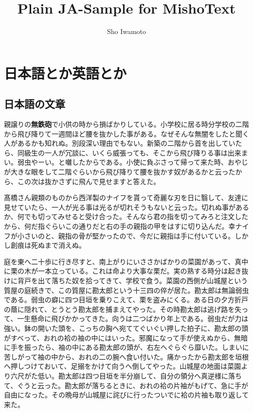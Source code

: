 \documentclass[11pt,pdfa,ja]{MishoText}
\title{Plain JA-Sample for MishoText}
\author{Sho Iwamoto}
\begin{document}
\maketitle

\chapter{日本語とか英語とか}
\section{日本語の文章}
親譲りの\textbf{無鉄砲}で小供の時から損ばかりしている。小学校に居る時分学校の二階から飛び降りて一週間ほど腰を抜かした事がある。なぜそんな無闇をしたと聞く人があるかも知れぬ。別段深い理由でもない。新築の二階から首を出していたら、同級生の一人が冗談に、いくら威張っても、そこから飛び降りる事は出来まい。弱虫やーい。と囃したからである。小使に負ぶさって帰って来た時、おやじが大きな眼をして二階ぐらいから飛び降りて腰を抜かす奴があるかと云ったから、この次は抜かさずに飛んで見せますと答えた。

髙橋さん親類のものから西洋製のナイフを貰って奇麗な刃を日に翳して、友達に見せていたら、一人が光る事は光るが切れそうもないと云った。切れぬ事があるか、何でも切ってみせると受け合った。そんなら君の指を切ってみろと注文したから、何だ指ぐらいこの通りだと右の手の親指の甲をはすに切り込んだ。幸ナイフが小さいのと、親指の骨が堅かったので、今だに親指は手に付いている。しかし創痕は死ぬまで消えぬ。

庭を東へ二十歩に行き尽すと、南上がりにいささかばかりの菜園があって、真中に栗の木が一本立っている。これは命より大事な栗だ。実の熟する時分は起き抜けに背戸を出て落ちた奴を拾ってきて、学校で食う。菜園の西側が山城屋という質屋の庭続きで、この質屋に勘太郎という十三四の倅が居た。勘太郎は無論弱虫である。弱虫の癖に四つ目垣を乗りこえて、栗を盗みにくる。ある日の夕方折戸の蔭に隠れて、とうとう勘太郎を捕まえてやった。その時勘太郎は逃げ路を失って、一生懸命に飛びかかってきた。向うは二つばかり年上である。弱虫だが力は強い。鉢の開いた頭を、こっちの胸へ宛ててぐいぐい押した拍子に、勘太郎の頭がすべって、おれの袷の袖の中にはいった。邪魔になって手が使えぬから、無暗に手を振ったら、袖の中にある勘太郎の頭が、右左へぐらぐら靡いた。しまいに苦しがって袖の中から、おれの二の腕へ食い付いた。痛かったから勘太郎を垣根へ押しつけておいて、足搦をかけて向うへ倒してやった。山城屋の地面は菜園より六尺がた低い。勘太郎は四つ目垣を半分崩して、自分の領分へ真逆様に落ちて、ぐうと云った。勘太郎が落ちるときに、おれの袷の片袖がもげて、急に手が自由になった。その晩母が山城屋に詫びに行ったついでに袷の片袖も取り返して来た。
\end{document}
